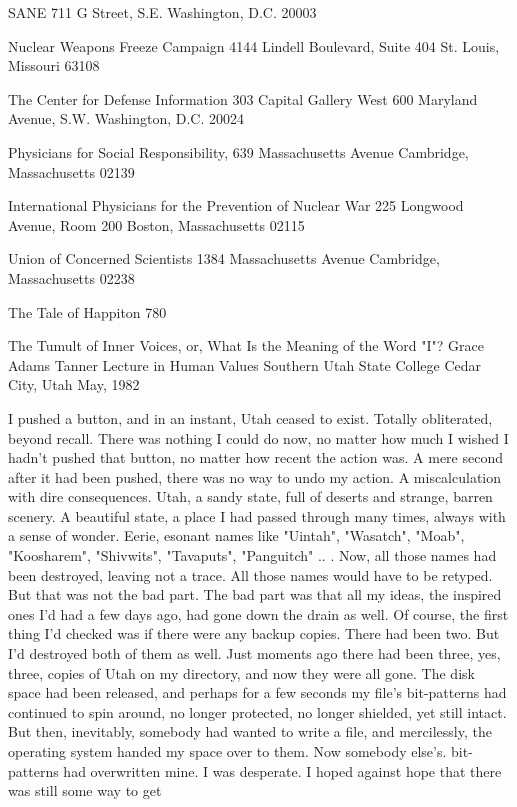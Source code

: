 SANE
711 G Street, S.E. Washington,
D.C. 20003

Nuclear Weapons Freeze Campaign
4144 Lindell Boulevard, Suite 404
St. Louis, Missouri 63108

The Center for Defense Information
303 Capital Gallery West
600 Maryland Avenue, S.W.
Washington, D.C. 20024

Physicians for Social Responsibility,
639 Massachusetts Avenue
Cambridge, Massachusetts 02139

International Physicians for the Prevention of Nuclear War
225 Longwood Avenue, Room 200
Boston, Massachusetts 02115

Union of Concerned Scientists
1384 Massachusetts Avenue
Cambridge, Massachusetts 02238




The Tale of Happiton                                                              780


                    The Tumult of Inner Voices,
                     or, What Is the Meaning
                         of the Word "I"?
                   Grace Adams Tanner Lecture in Human Values
                           Southern Utah State College
                                Cedar City, Utah
                                   May, 1982


I pushed a button, and in an instant, Utah ceased to exist. Totally obliterated, beyond
recall. There was nothing I could do now, no matter how much I wished I hadn't
pushed that button, no matter how recent the action was. A mere second after it had
been pushed, there was no way to undo my action. A miscalculation with dire
consequences.
         Utah, a sandy state, full of deserts and strange, barren scenery. A beautiful
state, a place I had passed through many times, always with a sense of wonder. Eerie,
esonant names like "Uintah", "Wasatch", "Moab", "Koosharem", "Shivwits",
"Tavaputs", "Panguitch" .. .
         Now, all those names had been destroyed, leaving not a trace. All those names
would have to be retyped. But that was not the bad part. The bad part was that all my
ideas, the inspired ones I'd had a few days ago, had gone down the drain as well. Of
course, the first thing I'd checked was if there were any backup copies. There had
been two. But I'd destroyed both of them as well. Just moments ago there had been
three, yes, three, copies of Utah on my directory, and now they were all gone. The
disk space had been released, and perhaps for a few seconds my file's bit-patterns had
continued to spin around, no longer protected, no longer shielded, yet still intact. But
then, inevitably, somebody had wanted to write a file, and mercilessly, the operating
system handed my space over to them. Now somebody else's. bit-patterns had
overwritten mine.
         I was desperate. I hoped against hope that there was still some way to get




